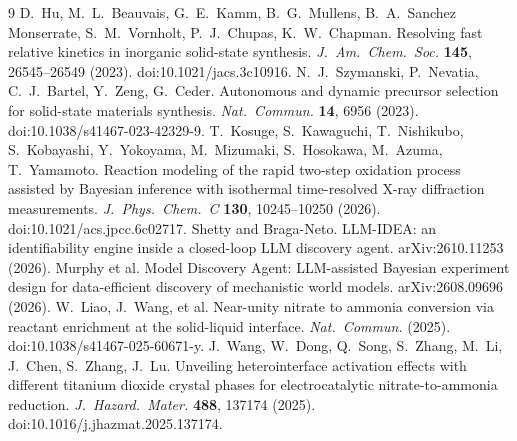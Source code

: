 \documentclass[10pt]{article}
\begin{document}
\begin{thebibliography}{9}
\footnotesize
\setlength{\itemsep}{0pt}\setlength{\parskip}{0pt}
 D.~Hu, M.~L.~Beauvais, G.~E.~Kamm, B.~G.~Mullens, B.~A.~Sanchez Monserrate, S.~M.~Vornholt, P.~J.~Chupas, K.~W.~Chapman. Resolving fast relative kinetics in inorganic solid-state synthesis. \emph{J.\ Am.\ Chem.\ Soc.} \textbf{145}, 26545--26549 (2023). doi:10.1021/jacs.3c10916.
 N.~J.~Szymanski, P.~Nevatia, C.~J.~Bartel, Y.~Zeng, G.~Ceder. Autonomous and dynamic precursor selection for solid-state materials synthesis. \emph{Nat.\ Commun.} \textbf{14}, 6956 (2023). doi:10.1038/s41467-023-42329-9.
 T.~Kosuge, S.~Kawaguchi, T.~Nishikubo, S.~Kobayashi, Y.~Yokoyama, M.~Mizumaki, S.~Hosokawa, M.~Azuma, T.~Yamamoto. Reaction modeling of the rapid two-step oxidation process assisted by Bayesian inference with isothermal time-resolved X-ray diffraction measurements. \emph{J.\ Phys.\ Chem.\ C} \textbf{130}, 10245--10250 (2026). doi:10.1021/acs.jpcc.6c02717.
 Shetty and Braga-Neto. LLM-IDEA: an identifiability engine inside a closed-loop LLM discovery agent. arXiv:2610.11253 (2026).
 Murphy et al. Model Discovery Agent: LLM-assisted Bayesian experiment design for data-efficient discovery of mechanistic world models. arXiv:2608.09696 (2026).
 W.~Liao, J.~Wang, et al. Near-unity nitrate to ammonia conversion via reactant enrichment at the solid-liquid interface. \emph{Nat.\ Commun.} (2025). doi:10.1038/s41467-025-60671-y.
 J.~Wang, W.~Dong, Q.~Song, S.~Zhang, M.~Li, J.~Chen, S.~Zhang, J.~Lu. Unveiling heterointerface activation effects with different titanium dioxide crystal phases for electrocatalytic nitrate-to-ammonia reduction. \emph{J.\ Hazard.\ Mater.} \textbf{488}, 137174 (2025). doi:10.1016/j.jhazmat.2025.137174.
\end{thebibliography}
\end{document}
